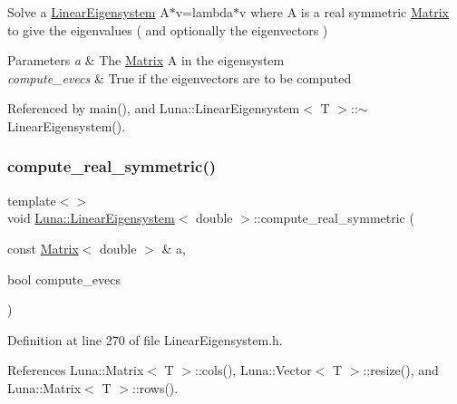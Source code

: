 Solve a \hyperlink{classLuna_1_1LinearEigensystem}{Linear\+Eigensystem} A$\ast$v=lambda$\ast$v where A is a real symmetric \hyperlink{classLuna_1_1Matrix}{Matrix} to give the eigenvalues ( and optionally the eigenvectors ) 


\begin{DoxyParams}{Parameters}
{\em a} & The \hyperlink{classLuna_1_1Matrix}{Matrix} A in the eigensystem \\
\hline
{\em compute\+\_\+evecs} & True if the eigenvectors are to be computed \\
\hline
\end{DoxyParams}


Referenced by main(), and Luna\+::\+Linear\+Eigensystem$<$ T $>$\+::$\sim$\+Linear\+Eigensystem().

\mbox{\label{classLuna_1_1LinearEigensystem_a239e3ff62330c51c94d0112de0318249}} 
\subsubsection{\texorpdfstring{compute\+\_\+real\+\_\+symmetric()}{compute\_real\_symmetric()}\hspace{0.1cm}{\footnotesize\ttfamily [2/2]}}
{\footnotesize\ttfamily template$<$$>$ \\
void \hyperlink{classLuna_1_1LinearEigensystem}{Luna\+::\+Linear\+Eigensystem}$<$ double $>$\+::compute\+\_\+real\+\_\+symmetric (\begin{DoxyParamCaption}\item[{const \hyperlink{classLuna_1_1Matrix}{Matrix}$<$ double $>$ \&}]{a,  }\item[{bool}]{compute\+\_\+evecs }\end{DoxyParamCaption})\hspace{0.3cm}{\ttfamily [inline]}}



Definition at line 270 of file Linear\+Eigensystem.\+h.



References Luna\+::\+Matrix$<$ T $>$\+::cols(), Luna\+::\+Vector$<$ T $>$\+::resize(), and Luna\+::\+Matrix$<$ T $>$\+::rows().



